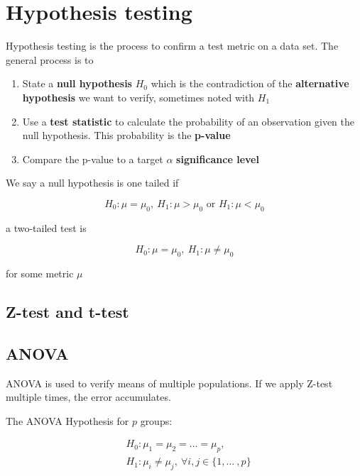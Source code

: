 \chapter{Hypothesis testing}

Hypothesis testing is the process to confirm a test metric on a data set. The general process is to

\begin{enumerate}
    \item State a \textbf{null hypothesis} \(H_0\) which is the contradiction of the \textbf{alternative hypothesis} we want to verify, sometimes noted with \(H_1\)
    \item Use a \textbf{test statistic} to calculate the probability of an observation given the null hypothesis. This probability is the \textbf{p-value}
    \item Compare the p-value to a target \(\alpha\) \textbf{significance level}
\end{enumerate}

We say a null hypothesis is one tailed if

\[H_0: \mu = \mu_0,\ H_1 : \mu > \mu_0 \text{ or } H_1 : \mu < \mu_0\]

a two-tailed test is

\[H_0: \mu = \mu_0,\ H_1 : \mu \ne \mu_0\]

for some metric \(\mu\)

\section{Z-test and t-test}

\section{ANOVA}

ANOVA is used to verify means of multiple populations. If we apply Z-test multiple times, the error accumulates.

The ANOVA Hypothesis for \(p\) groups:

\[
\begin{aligned}
&H_0: \mu_1 = \mu_2 = ... = \mu_p,\  \\
&H_1: \mu_i \ne \mu_j,\ \forall i, j \in \{1, ...\ , p\}
\end{aligned}
\]


